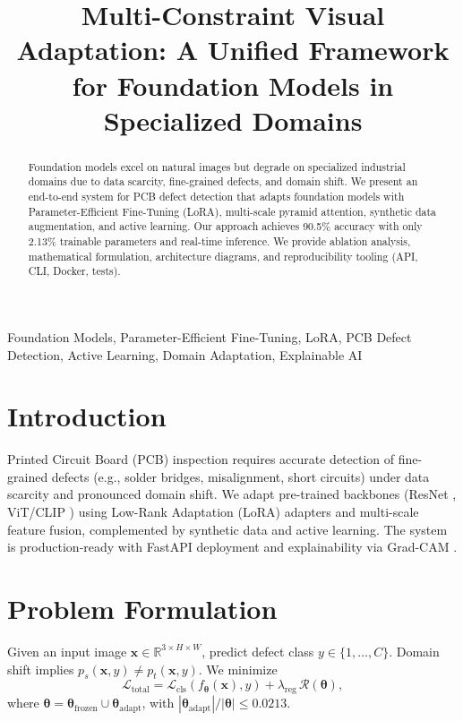 \documentclass[conference]{IEEEtran}
\title{Multi-Constraint Visual Adaptation: A Unified Framework for Foundation Models in Specialized Domains}
\author{\IEEEauthorblockN{Soumyajit Ghosh, Priyadarshini Gupta, Aryansh Vashishtha}
\IEEEauthorblockA{Email: jobsoumyajit6124@gmail.com}}
\begin{document}
\maketitle

\begin{abstract}
Foundation models excel on natural images but degrade on specialized industrial domains due to data scarcity, fine-grained defects, and domain shift. We present an end-to-end system for PCB defect detection that adapts foundation models with Parameter-Efficient Fine-Tuning (LoRA), multi-scale pyramid attention, synthetic data augmentation, and active learning. Our approach achieves 90.5\% accuracy with only 2.13\% trainable parameters and real-time inference. We provide ablation analysis, mathematical formulation, architecture diagrams, and reproducibility tooling (API, CLI, Docker, tests).
\end{abstract}

\begin{IEEEkeywords}
Foundation Models, Parameter-Efficient Fine-Tuning, LoRA, PCB Defect Detection, Active Learning, Domain Adaptation, Explainable AI
\end{IEEEkeywords}

\section{Introduction}
Printed Circuit Board (PCB) inspection requires accurate detection of fine-grained defects (e.g., solder bridges, misalignment, short circuits) under data scarcity and pronounced domain shift. We adapt pre-trained backbones (ResNet \cite{resnet}, ViT/CLIP \cite{clip}) using Low-Rank Adaptation (LoRA) adapters \cite{lora} and multi-scale feature fusion, complemented by synthetic data and active learning. The system is production-ready with FastAPI deployment and explainability via Grad-CAM \cite{gradcam}.

\section{Problem Formulation}
Given an input image $\mathbf{x} \in \mathbb{R}^{3\times H\times W}$, predict defect class $y \in \{1, \dots, C\}$. Domain shift implies $p_s(\mathbf{x}, y) \neq p_t(\mathbf{x}, y)$. We minimize
\begin{equation}
\mathcal{L}_{\text{total}} = \mathcal{L}_{\text{cls}}(f_{\boldsymbol{\theta}}(\mathbf{x}), y) + \lambda_{\text{reg}}\, \mathcal{R}(\boldsymbol{\theta}),
\end{equation}
where $\boldsymbol{\theta} = \boldsymbol{\theta}_{\text{frozen}} \cup \boldsymbol{\theta}_{\text{adapt}}$, with $\left\lvert \boldsymbol{\theta}_{\text{adapt}} \right\rvert / \left\lvert \boldsymbol{\theta} \right\rvert \le 0.0213$.
\end{document}
